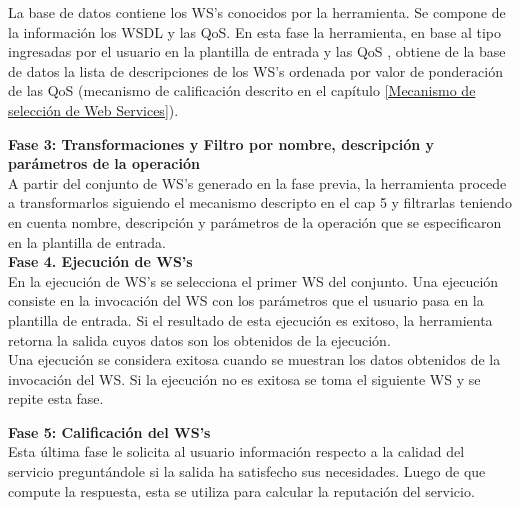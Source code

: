 La base de datos contiene los WS's conocidos por la herramienta. Se compone de la información los WSDL y las QoS.  En esta fase la herramienta, en base al tipo ingresadas por el usuario en la plantilla de entrada y las QoS , obtiene de la base de datos la lista de descripciones de los WS's ordenada por valor de ponderación de las QoS (mecanismo de calificación descrito en el capítulo \ref{Mecanismo de selección de Web Services}). 






\textbf{Fase 3: Transformaciones y Filtro por nombre, descripción y parámetros de la operación}\\

A partir del conjunto de WS's generado en la fase previa, la herramienta procede a transformarlos siguiendo el mecanismo descripto en el cap 5 y filtrarlas teniendo en cuenta nombre, descripción y parámetros de la operación que se especificaron en la plantilla de entrada.\\	

\textbf{Fase 4. Ejecución de WS's}\\

En la ejecución de WS's se selecciona el primer WS del conjunto. Una ejecución consiste en la invocación del WS con los parámetros que el usuario pasa en la plantilla de entrada. Si el resultado de esta ejecución es exitoso, la herramienta retorna la salida cuyos datos son los obtenidos de la ejecución.\\
Una ejecución se considera exitosa cuando se muestran  los datos obtenidos de la invocación del WS. Si la ejecución no es exitosa se toma el siguiente WS y se repite esta fase.





\textbf{Fase 5: Calificación del WS's}\\

Esta última fase le solicita al usuario información respecto a la calidad del servicio preguntándole si la salida ha satisfecho sus necesidades. Luego de que compute la respuesta, esta se utiliza para calcular la reputación del servicio.


